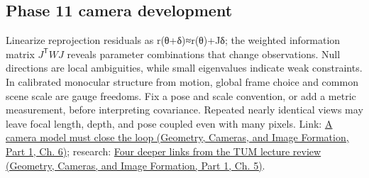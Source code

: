 \subsection{Phase 11 camera development}\label{appendix-3ee9861904d5-phase-11-camera-development}

\hypertarget{appendix-3ee9861904d5-phase-11-camera-development}{}

Linearize reprojection residuals as r(θ+δ)≈r(θ)+Jδ; the weighted information matrix \(J^{\mathsf T}WJ\) reveals parameter combinations that change observations. Null directions are local ambiguities, while small eigenvalues indicate weak constraints. In calibrated monocular structure from motion, global frame choice and common scene scale are gauge freedoms. Fix a pose and scale convention, or add a metric measurement, before interpreting covariance. Repeated nearly identical views may leave focal length, depth, and pose coupled even with many pixels. Link: \href{../03-Geometry-Cameras-and-Image-Formation-P01/main.pdf\#nameddest=02-foundations-ii-ch037-a-camera-model-must-close-the-loop}{A camera model must close the loop (Geometry, Cameras, and Image Formation, Part 1, Ch. 6)}; research: \href{../03-Geometry-Cameras-and-Image-Formation-P01/main.pdf\#nameddest=02-foundations-ii-ch036-four-deeper-links-from-the-tum-lecture-review}{Four deeper links from the TUM lecture review (Geometry, Cameras, and Image Formation, Part 1, Ch. 5)}.
